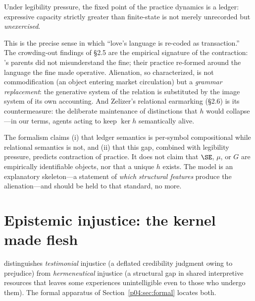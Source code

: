 \begin{proposition}[Informal]
Under legibility pressure, the fixed point of the practice dynamics is a
ledger: expressive capacity strictly greater than finite-state is not merely
unrecorded but \emph{unexercised}.
\end{proposition}

This is the precise sense in which ``love's language is re-coded as
transaction.'' The crowding-out findings of \S2.5 are the empirical
signature of the contraction: \citeauthor{gneezy2000}'s parents did not
misunderstand the fine; their practice re-formed around the language the fine
made operative. Alienation, so characterized, is not commodification (an
object entering market circulation) but a \emph{grammar replacement}: the
generative system of the relation is substituted by the image system of its
own accounting. And Zelizer's relational earmarking (\S2.6) is its
countermeasure: the deliberate maintenance of distinctions that $h$ would
collapse---in our terms, agents acting to keep $\ker h$ semantically alive.

\begin{remark}[Scope]
\label{p04:rem:scope}
The formalism claims (i) that ledger semantics is per-symbol compositional
while relational semantics is not, and (ii) that this gap, combined with
legibility pressure, predicts contraction of practice. It does not claim that
$\SE$, $\mu$, or $G$ are empirically identifiable objects, nor that a unique
$h$ exists. The model is an explanatory skeleton---a statement of \emph{which
structural features} produce the alienation---and should be held to that
standard, no more.
\end{remark}

\section{Epistemic injustice: the kernel made flesh}
\label{p04:sec:epistemic}

\textcite{fricker2007} distinguishes \emph{testimonial} injustice (a deflated
credibility judgment owing to prejudice) from \emph{hermeneutical} injustice
(a structural gap in shared interpretive resources that leaves some
experiences unintelligible even to those who undergo them). The formal
apparatus of Section~\ref{p04:sec:formal} locates both.

